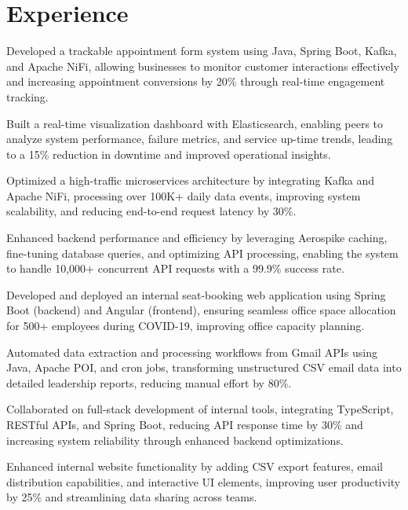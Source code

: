 \documentclass[]{resumebb}
\begin{document}
\section{\Large Experience}
\vspace{2pt}
\begin{tightemize}
    \item Developed a trackable appointment form system using Java, Spring Boot, Kafka, and Apache NiFi, allowing businesses to monitor customer interactions effectively and increasing appointment conversions by 20\% through real-time engagement tracking.
    \item Built a real-time visualization dashboard with Elasticsearch, enabling peers to analyze system performance, failure metrics, and service up-time trends, leading to a 15\% reduction in downtime and improved operational insights.
    \item Optimized a high-traffic microservices architecture by integrating Kafka and Apache NiFi, processing over 100K+ daily data events, improving system scalability, and reducing end-to-end request latency by 30\%.
    \item Enhanced backend performance and efficiency by leveraging Aerospike caching, fine-tuning database queries, and optimizing API processing, enabling the system to handle 10,000+ concurrent API requests with a 99.9\% success rate.
\end{tightemize}
\sectionsep

\begin{tightemize}
    \item Developed and deployed an internal seat-booking web application using Spring Boot (backend) and Angular (frontend), ensuring seamless office space allocation for 500+ employees during COVID-19, improving office capacity planning.
    \item Automated data extraction and processing workflows from Gmail APIs using Java, Apache POI, and cron jobs, transforming unstructured CSV email data into detailed leadership reports, reducing manual effort by 80\%.
    \item Collaborated on full-stack development of internal tools, integrating TypeScript, RESTful APIs, and Spring Boot, reducing API response time by 30\% and increasing system reliability through enhanced backend optimizations.
    \item Enhanced internal website functionality by adding CSV export features, email distribution capabilities, and interactive UI elements, improving user productivity by 25\% and streamlining data sharing across teams.
\end{tightemize}
\sectionsep
\end{document}
